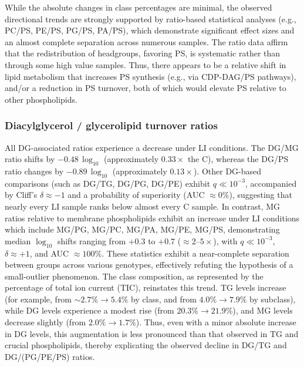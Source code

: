 \documentclass[10pt,letterpaper]{article}
\begin{document}
While the absolute changes in class percentages are minimal, the observed directional trends are strongly supported by ratio-based statistical analyses (e.g., PC/PS, PE/PS, PG/PS, PA/PS), which demonstrate significant effect sizes and an almost complete separation across numerous samples. The ratio data affirm that the redistribution of headgroups, favoring PS, is systematic rather than through some high value samples. Thus, there appears to be a relative shift in lipid metabolism that increases PS synthesis (e.g., via CDP-DAG/PS pathways), and/or a reduction in PS turnover, both of which would elevate PS relative to other phospholipids. 



\subsubsection*{Diacylglycerol / glycerolipid turnover ratios}
All DG-associated ratios experience a decrease under LI conditions. The DG/MG ratio shifts by $-0.48 \,\log_{10}$ (approximately $0.33\times$ the C), whereas the DG/PS ratio changes by $-0.89 \,\log_{10}$ (approximately $0.13\times$). Other DG-based comparisons (such as DG/TG, DG/PG, DG/PE) exhibit $q \ll 10^{-3}$, accompanied by Cliff’s $\delta \approx -1$ and a probability of superiority (AUC $\approx 0\%$), suggesting that nearly every LI sample ranks below almost every C sample. In contrast, MG ratios relative to membrane phospholipids exhibit an increase under LI conditions which include MG/PG, MG/PC, MG/PA, MG/PE, MG/PS, demonstrating median $\log_{10}$ shifts ranging from $+0.3$ to $+0.7$ ($\approx 2$–$5\times$), with $q \ll 10^{-3}$, $\delta \approx +1$, and AUC $\approx 100\%$. These statistics exhibit a near-complete separation between groups across various genotypes, effectively refuting the hypothesis of a small-outlier phenomenon. The class composition, as represented by the percentage of total ion current (TIC), reinstates this trend. TG levels increase (for example, from $\sim 2.7\% \rightarrow 5.4\%$ by class, and from $4.0\% \rightarrow 7.9\%$ by subclass), while DG levels experience a modest rise (from $20.3\% \rightarrow 21.9\%$), and MG levels decrease slightly (from $2.0\% \rightarrow 1.7\%$). Thus, even with a minor absolute increase in DG levels, this augmentation is less pronounced than that observed in TG and crucial phospholipids, thereby explicating the observed decline in DG/TG and DG/(PG/PE/PS) ratios. 
\end{document}
